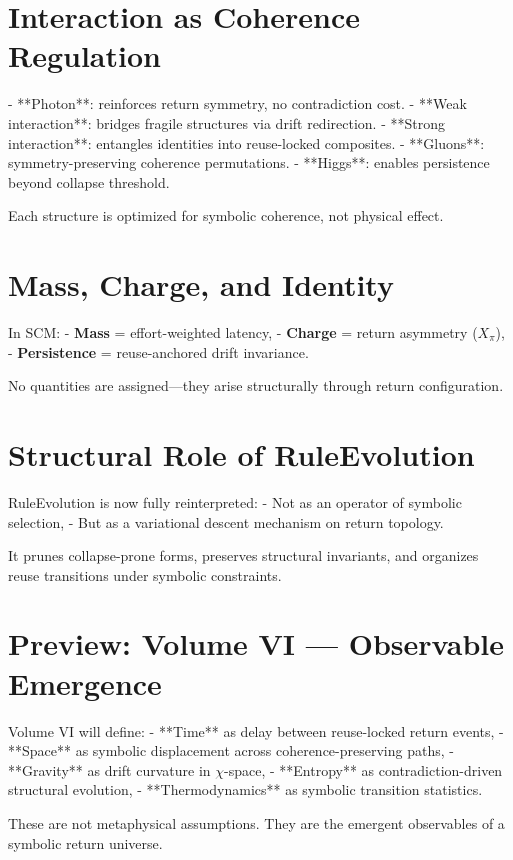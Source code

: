 \section{Interaction as Coherence Regulation} \label{sec:coherence-regulation}

- **Photon**: reinforces return symmetry, no contradiction cost.
- **Weak interaction**: bridges fragile structures via drift redirection.
- **Strong interaction**: entangles identities into reuse-locked composites.
- **Gluons**: symmetry-preserving coherence permutations.
- **Higgs**: enables persistence beyond collapse threshold.

Each structure is optimized for symbolic coherence, not physical effect.

\section{Mass, Charge, and Identity} \label{sec:mass-charge-recap}

In SCM:
- \textbf{Mass} = effort-weighted latency,
- \textbf{Charge} = return asymmetry ($X_\pi$),
- \textbf{Persistence} = reuse-anchored drift invariance.

No quantities are assigned—they arise structurally through return configuration.

\section{Structural Role of RuleEvolution} \label{sec:re-role}

RuleEvolution is now fully reinterpreted:
- Not as an operator of symbolic selection,
- But as a variational descent mechanism on return topology.

It prunes collapse-prone forms, preserves structural invariants, and organizes reuse transitions under symbolic constraints.

\section{Preview: Volume VI — Observable Emergence} \label{sec:volume-vi-preview}

Volume VI will define:
- **Time** as delay between reuse-locked return events,
- **Space** as symbolic displacement across coherence-preserving paths,
- **Gravity** as drift curvature in $\chi$-space,
- **Entropy** as contradiction-driven structural evolution,
- **Thermodynamics** as symbolic transition statistics.

These are not metaphysical assumptions. They are the emergent observables of a symbolic return universe.

